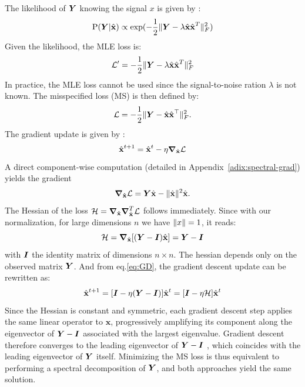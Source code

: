 \documentclass[11pt]{article}
\begin{document}
The likelihood of $\bm{Y}$ knowing the signal $x$ is given by :
\begin{equation}
    \text{P}(\bm{Y} | \hat{\boldsymbol{\mathbf{x}}}) \propto \text{exp}(-\frac{1}{2}  \|\bm{Y} - \lambda \hat{\boldsymbol{\mathbf{x}}}\hat{\boldsymbol{\mathbf{x}}}^T \|^2_F)
\end{equation}
\noindent
Given the likelihood, the MLE loss is:
\begin{equation}
    \mathcal{L'} = -\frac{1}{2}  \|\bm{Y} - \lambda \hat{\boldsymbol{\mathbf{x}}}\hat{\boldsymbol{\mathbf{x}}}^T \|^2_F
\end{equation}
\noindent
In practice, the MLE loss cannot be used since the signal-to-noise ration $\lambda$ is not known. The misspecified loss (MS) is then defined by:
\begin{equation}
    \mathcal{L}=-\frac{1}{2}  \|\bm{Y} - \hat{\boldsymbol{\mathbf{x}}}\hat{\boldsymbol{\mathbf{x}}}^{\top} \|^2_F .
      \label{eq:MSloss}
\end{equation}
 The gradient update is given by :
 \begin{equation}
    {\hat{\ensuremath{\boldsymbol{\mathbf{x}}}}}^{t+1} = {\hat{\boldsymbol{\mathbf{x}}}}^t - \eta \boldsymbol{\mathbf{\nabla}}_{{\hat{\boldsymbol{\mathbf{x}}}}} \mathcal{L}
     \label{eq:GD}
 \end{equation}
\noindent
A direct component-wise computation (detailed in Appendix~\ref{adix:spectral-grad}) yields the gradient
\begin{equation}
    \boldsymbol{\mathbf{\nabla_{\hat{\boldsymbol{\mathbf{x}}}}}}\mathcal{L} = \bm{Y} \hat{\boldsymbol{\mathbf{x}}} -  \|\hat{\boldsymbol{\mathbf{x}}} \|^2 \hat{\boldsymbol{\mathbf{x}}}.
\end{equation}
\noindent
The Hessian of the loss $\mathcal{H}= \boldsymbol{\mathbf{\nabla}}_{\hat{\boldsymbol{\mathbf{x}}}}\boldsymbol{\mathbf{\nabla}}_{\hat{\boldsymbol{\mathbf{x}}}}^T \mathcal{L}$ follows immediately. Since with our normalization, for large dimensions $n$ we have $ \|x \| = 1$, it reads:
\begin{equation}
    \mathcal{H} = \boldsymbol{\mathbf{\nabla}}_{\hat{\boldsymbol{\mathbf{x}}}} [(\bm{Y}  -\bm{I}) \hat{\boldsymbol{\mathbf{x}}}] = \bm{Y}  -\bm{I} \\
\end{equation}
with $\bm{I}$ the identity matrix of dimensions $n \times n $. The hessian depends only on the observed matrix $\bm{Y}$. And from eq.\ref{eq:GD}, the gradient descent update can be rewritten as:
\begin{equation}
    \hat{\boldsymbol{\mathbf{x}}}^{t+1} = [\bm{I} - \eta (\bm{Y} - \bm{I})] \hat{\boldsymbol{\mathbf{x}}}^t = [\bm{I} - \eta \mathcal{H}] \hat{\boldsymbol{\mathbf{x}}}^t
\end{equation}
Since the Hessian is constant and symmetric, each gradient descent step applies the same linear operator to $\mathbf{x}$, progressively amplifying its component along the eigenvector of $\bm{Y} - \bm{I}$  associated with the largest eigenvalue. Gradient descent therefore converges to the leading eigenvector of $\bm{Y} - \bm{I}$ , which coincides with the leading eigenvector of $\bm{Y}$ itself.
Minimizing the MS loss is thus equivalent to performing a spectral decomposition of $\bm{Y}$, and both approaches yield the same solution.
\end{document}
